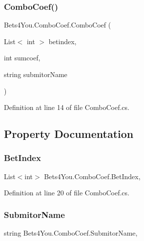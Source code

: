 \subsubsection{\texorpdfstring{ComboCoef()}{ComboCoef()}}
{\footnotesize\ttfamily Bets4\+You.\+Combo\+Coef.\+Combo\+Coef (\begin{DoxyParamCaption}\item[{List$<$ int $>$}]{betindex,  }\item[{int}]{sumcoef,  }\item[{string}]{submitor\+Name }\end{DoxyParamCaption})}



Definition at line 14 of file Combo\+Coef.\+cs.



\subsection{Property Documentation}
\mbox{\label{class_bets4_you_1_1_combo_coef_aa840bb69e3818918b633146835874daf}} 
\subsubsection{\texorpdfstring{BetIndex}{BetIndex}}
{\footnotesize\ttfamily List$<$int$>$ Bets4\+You.\+Combo\+Coef.\+Bet\+Index\hspace{0.3cm}{\ttfamily [get]}, {\ttfamily [set]}}



Definition at line 20 of file Combo\+Coef.\+cs.

\mbox{\label{class_bets4_you_1_1_combo_coef_a59711f6d39ff866333be88dd0ae45efa}} 
\subsubsection{\texorpdfstring{SubmitorName}{SubmitorName}}
{\footnotesize\ttfamily string Bets4\+You.\+Combo\+Coef.\+Submitor\+Name\hspace{0.3cm}{\ttfamily [get]}, {\ttfamily [set]}}



